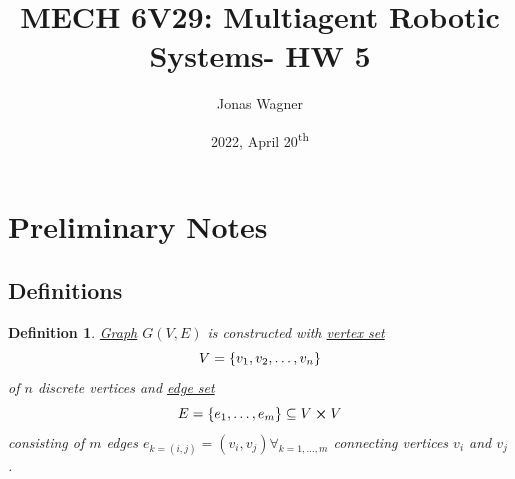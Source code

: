 \documentclass[]{article}
\title{MECH 6V29: Multiagent Robotic Systems- HW 5}
\author{Jonas Wagner}
\date{2022, April 20\textsuperscript{th}}
\numberwithin{equation}{section}
\newtheorem{definition}{Definition}
\begin{document}
	

\maketitle

\tableofcontents

\newpage
\section*{Preliminary Notes}

\subsection{Definitions}
\begin{definition} \label{def:graph_def}
	\underline{\emph{Graph}} $G(V,E)$ is constructed with \underline{\emph{vertex set}} \[
		V = \qty{v_1,v_2,\dots,v_n}
	\] of $n$ discrete vertices and \emph{\underline{edge set}} \[
		E = \qty{e_1, \dots, e_m} \subseteq V \cross V
	\] consisting of $m$ edges $e_{k=(i,j)} = (v_i,v_j) \forall_{k=1,\dots,m}$ connecting vertices $v_i$ and $v_j$.
\end{definition}


\end{document}
